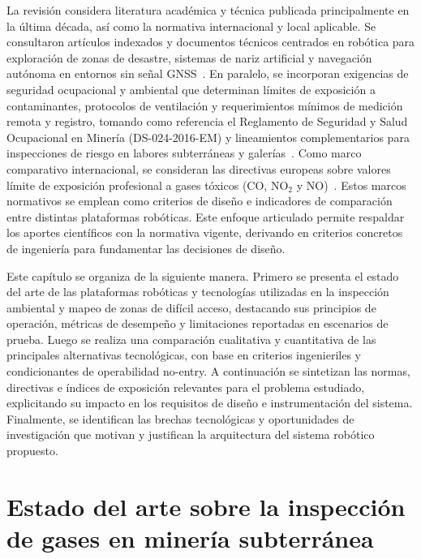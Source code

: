 \medskip

\noindent La revisión considera literatura académica y técnica publicada principalmente en la última década, así como la normativa internacional y local aplicable. Se consultaron artículos indexados y documentos técnicos centrados en robótica para exploración de zonas de desastre, sistemas de nariz artificial y navegación autónoma en entornos sin señal GNSS~\cite{CruzUlloa2024_Nose,Machines_2024_ArtificialNose}. En paralelo, se incorporan exigencias de seguridad ocupacional y ambiental que determinan límites de exposición a contaminantes, protocolos de ventilación y requerimientos mínimos de medición remota y registro, tomando como referencia el Reglamento de Seguridad y Salud Ocupacional en Minería (DS-024-2016-EM) y lineamientos complementarios para inspecciones de riesgo en labores subterráneas y galerías~\cite{MINEM_DS024_2016,OSINERGMIN_BoletinGSM_2020b}. Como marco comparativo internacional, se consideran las directivas europeas sobre valores límite de exposición profesional a gases tóxicos ($\text{CO}$, $\text{NO}_2$ y $\text{NO}$)~\cite{EU_ExposureDirective_2020,TatoDiogo2020_IOELVs}. Estos marcos normativos se emplean como criterios de diseño e indicadores de comparación entre distintas plataformas robóticas. Este enfoque articulado permite respaldar los aportes científicos con la normativa vigente, derivando en criterios concretos de ingeniería para fundamentar las decisiones de diseño.

\medskip

\noindent Este capítulo se organiza de la siguiente manera. Primero se presenta el estado del arte de las plataformas robóticas y tecnologías utilizadas en la inspección ambiental y mapeo de zonas de difícil acceso, destacando sus principios de operación, métricas de desempeño y limitaciones reportadas en escenarios de prueba. Luego se realiza una comparación cualitativa y cuantitativa de las principales alternativas tecnológicas, con base en criterios ingenieriles y condicionantes de operabilidad no-entry. A continuación se sintetizan las normas, directivas e índices de exposición relevantes para el problema estudiado, explicitando su impacto en los requisitos de diseño e instrumentación del sistema. Finalmente, se identifican las brechas tecnológicas y oportunidades de investigación que motivan y justifican la arquitectura del sistema robótico propuesto.


\section{Estado del arte sobre la inspección de gases en minería subterránea}

